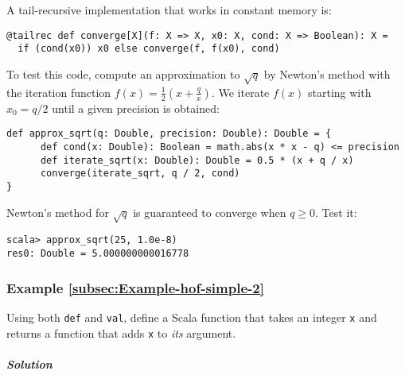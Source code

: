 A tail-recursive implementation that works in constant memory is:
\begin{lstlisting}
@tailrec def converge[X](f: X => X, x0: X, cond: X => Boolean): X =
  if (cond(x0)) x0 else converge(f, f(x0), cond)
\end{lstlisting}
To test this code, compute an approximation to $\sqrt{q}$ by Newton\textsf{'}s
method with the iteration function $f(x)=\frac{1}{2}\left(x+\frac{q}{x}\right)$.
We iterate $f(x)$ starting with $x_{0}=q/2$ until a given precision
is obtained:
\begin{lstlisting}
def approx_sqrt(q: Double, precision: Double): Double = {
      def cond(x: Double): Boolean = math.abs(x * x - q) <= precision
      def iterate_sqrt(x: Double): Double = 0.5 * (x + q / x)
      converge(iterate_sqrt, q / 2, cond)
}
\end{lstlisting}
Newton\textsf{'}s method for $\sqrt{q}$ is guaranteed to converge when $q\geq0$.
Test it:
\begin{lstlisting}
scala> approx_sqrt(25, 1.0e-8)
res0: Double = 5.000000000016778
\end{lstlisting}


\subsubsection{Example \label{subsec:Example-hof-simple-2}\ref{subsec:Example-hof-simple-2}}

Using both \lstinline!def! and \lstinline!val!, define a Scala function
that takes an integer \lstinline!x! and returns a function that adds
\lstinline!x! to \emph{its} argument.

\subparagraph{Solution}

